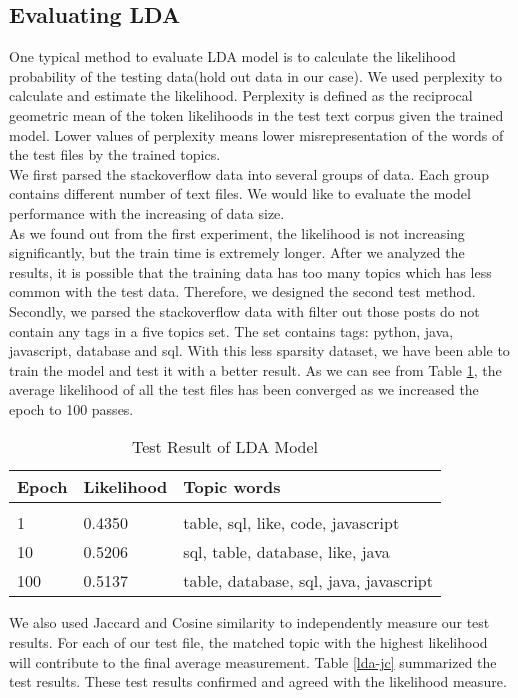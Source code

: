 \subsection{Evaluating LDA}
One typical method to evaluate LDA model is to calculate the likelihood probability of the testing data(hold out data in our case). We used perplexity to calculate and estimate the likelihood. Perplexity is defined as the reciprocal geometric mean of the token likelihoods in the test text corpus given the trained model. Lower values of perplexity means lower misrepresentation of the words of the test files by the trained topics.\\ 
We first parsed the stackoverflow data into several groups of data. Each group contains different number of text files. We would like to evaluate the model performance with the increasing of  data size.\\
As we found out from the first experiment, the likelihood is not increasing significantly, but the train time is extremely longer. After we analyzed the results, it is possible that the training data has too many topics which has less common with the test data. Therefore, we designed the second test method.\\
Secondly, we parsed the stackoverflow data with filter out those posts do not contain any tags in a five topics set. The set contains tags: python, java, javascript, database and sql. With this less sparsity dataset, we have been able to train the model and test it with a better result. As we can see from Table \ref{lda-result}, the average likelihood of all the test files has been converged as we increased the epoch to 100 passes.\\
\begin{table}[!htbp]
\caption{Test Result of LDA Model}
\label{lda-result}
\begin{center}
\begin{tabular}{  l  l l}
\bf Epoch & \bf Likelihood & \bf Topic words\\ \hline \\
1         &0.4350 & table, sql, like, code, javascript\\
10       &0.5206 & sql, table, database, like, java\\
100     &0.5137& table, database, sql, java, javascript\\
\end{tabular}
\end{center}
\end{table}
We also used Jaccard and Cosine similarity to independently measure our test results. For each of our test file, the matched topic with the highest likelihood will contribute to the final average measurement. Table \ref{lda-jc} summarized the test results. These test results confirmed and agreed with the likelihood measure. \\
